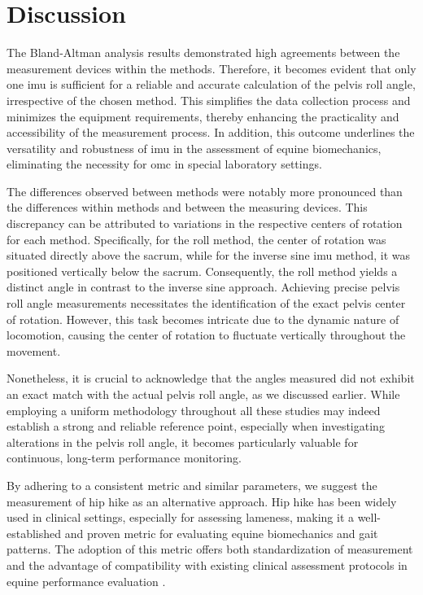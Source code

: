 \section{Discussion}
\label{sec:discussion}

The Bland-Altman analysis results demonstrated high agreements between the measurement devices within the methods. Therefore, it becomes evident that only one \gls{imu} is sufficient for a reliable and accurate calculation of the pelvis roll angle, irrespective of the chosen method. This simplifies the data collection process and minimizes the equipment requirements, thereby enhancing the practicality and accessibility of the measurement process. In addition, this outcome underlines the versatility and robustness of \gls{imu} in the assessment of equine biomechanics, eliminating the necessity for \gls{omc} in special laboratory settings.







The differences observed between methods were notably more pronounced than the differences within methods and between the measuring devices. This discrepancy can be attributed to variations in the respective centers of rotation for each method. Specifically, for the roll method, the center of rotation was situated directly above the sacrum, while for the inverse sine \gls{imu} method, it was positioned vertically below the sacrum. Consequently, the roll method yields a distinct angle in contrast to the inverse sine approach. Achieving precise pelvis roll angle measurements necessitates the identification of the exact pelvis center of rotation. However, this task becomes intricate due to the dynamic nature of locomotion, causing the center of rotation to fluctuate vertically throughout the movement.



Nonetheless, it is crucial to acknowledge that the angles measured did not exhibit an exact match with the actual pelvis roll angle, as we discussed earlier. While employing a uniform methodology throughout all these studies may indeed establish a strong and reliable reference point, especially when investigating alterations in the pelvis roll angle, it becomes particularly valuable for continuous, long-term performance monitoring. 

By adhering to a consistent metric and similar parameters, we suggest the measurement of hip hike as an alternative approach. Hip hike has been widely used in clinical settings, especially for assessing lameness, making it a well-established and proven metric for evaluating equine biomechanics and gait patterns. The adoption of this metric offers both standardization of measurement and the advantage of compatibility with existing clinical assessment protocols in equine performance evaluation \cite{Greve2018, Day2020}. 
